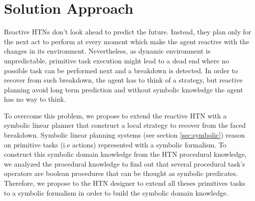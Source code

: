 \documentclass[conference]{IEEEtran}
\begin{document}
	
	
	\section{Solution Approach}
	
	\par Reactive HTNs don't look ahead to predict the future. Instead, they plan only for the next act to perform at every moment which make the agent reactive with the changes in its environment.  Nevertheless, as dynamic environment is unpredictable,  primitive task execution might lead to a dead end where no possible task can be performed next and a breakdown is detected. In order to recover from such breakdown, the agent has to think of a strategy, but reactive planning avoid long term prediction and without symbolic knowledge the agent has no way to think. 
	\par To overcome this problem, we propose to extend the reactive HTN with a symbolic linear planner that construct a local strategy to recover from the faced breakdown. Symbolic linear planning systems (see section \ref{sec:symbolic}) reason on primitive tasks (i.e actions)   represented with a symbolic formalism. To construct this symbolic domain knowledge from the HTN procedural knowledge, we analyzed the procedural knowledge to find out that several procedural task's operators are boolean procedures that can be thought as symbolic predicates. Therefore, we propose to the HTN designer to extend all theses primitives tasks to a symbolic formalism in order to build the symbolic domain knowledge.                               
\end{document}
